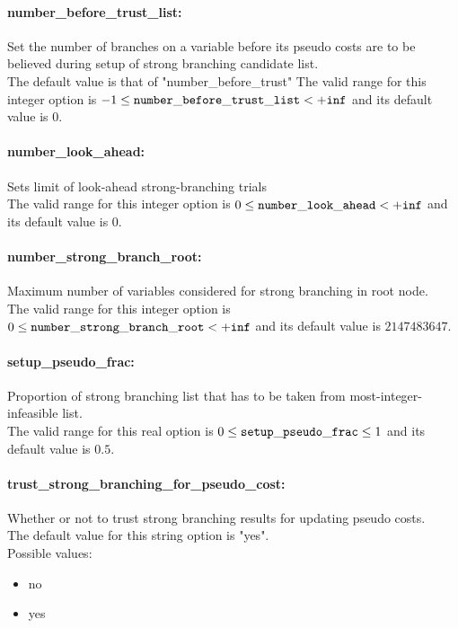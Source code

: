 \paragraph{number\_before\_trust\_list:}\label{opt:number_before_trust_list} Set the number of branches on a variable before its pseudo costs are to be believed during setup of strong branching candidate list. \\
 The default value is that of "number\_before\_trust" The valid range for this integer option is
$-1 \le {\tt number\_before\_trust\_list } <  {\tt +inf}$
and its default value is $0$.


\paragraph{number\_look\_ahead:}\label{opt:number_look_ahead} Sets limit of look-ahead strong-branching trials \\
 The valid range for this integer option is
$0 \le {\tt number\_look\_ahead } <  {\tt +inf}$
and its default value is $0$.


\paragraph{number\_strong\_branch\_root:}\label{opt:number_strong_branch_root} Maximum number of variables considered for strong branching in root node. \\
 The valid range for this integer option is
$0 \le {\tt number\_strong\_branch\_root } <  {\tt +inf}$
and its default value is $2147483647$.


\paragraph{setup\_pseudo\_frac:}\label{opt:setup_pseudo_frac} Proportion of strong branching list that has to be taken from most-integer-infeasible list. \\
 The valid range for this real option is 
$0 \le {\tt setup\_pseudo\_frac } \le 1$
and its default value is $0.5$.


\paragraph{trust\_strong\_branching\_for\_pseudo\_cost:}\label{opt:trust_strong_branching_for_pseudo_cost} Whether or not to trust strong branching results for updating pseudo costs. \\
The default value for this string option is "yes".
\\ 
Possible values:
\begin{itemize}
   \item no
   \item yes
\end{itemize}

